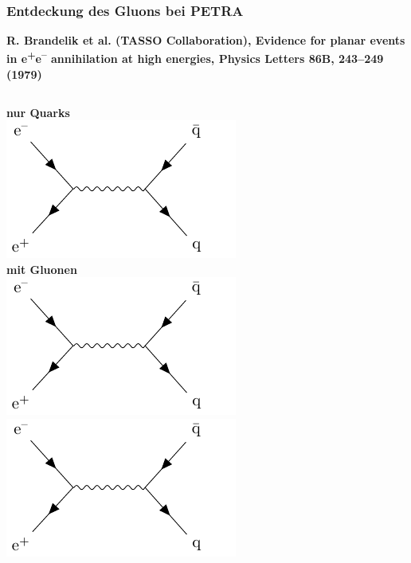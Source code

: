 \documentclass[10pt,t]{beamer}
\begin{document}
\begin{frame}
\frametitle{Entdeckung des Gluons bei PETRA}
\vspace*{-2.6\baselineskip}
\alert{\bfseries\footnotesize R. Brandelik et al. (TASSO Collaboration), Evidence for planar events in e\textsuperscript{+}e\textsuperscript{--} annihilation at high energies, Physics Letters 86B, 243--249 (1979) \cite{Brandelik1979}}
\vspace*{\baselineskip}
\begin{columns}
    \textbf{nur Quarks} \\
    \includegraphics[width=\textwidth,page=1]{gluon-feynman} \\[1ex]
    \textbf{mit Gluonen} \\
    \includegraphics[width=\textwidth,page=2]{gluon-feynman} \\
    \includegraphics[width=\textwidth,page=3]{gluon-feynman} \\

\end{columns}
\end{frame}
\end{document}
